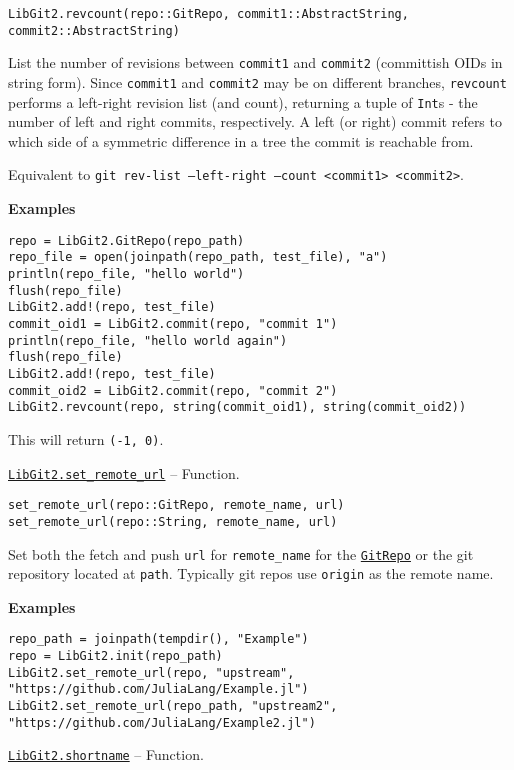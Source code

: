 \begin{adjustwidth}{2em}{0pt}


\begin{verbatim}
LibGit2.revcount(repo::GitRepo, commit1::AbstractString, commit2::AbstractString)
\end{verbatim}

List the number of revisions between \texttt{commit1} and \texttt{commit2} (committish OIDs in string form). Since \texttt{commit1} and \texttt{commit2} may be on different branches, \texttt{revcount} performs a {\textquotedbl}left-right{\textquotedbl} revision list (and count), returning a tuple of \texttt{Int}s - the number of left and right commits, respectively. A left (or right) commit refers to which side of a symmetric difference in a tree the commit is reachable from.

Equivalent to \texttt{git rev-list --left-right --count <commit1> <commit2>}.

\textbf{Examples}


\begin{verbatim}
repo = LibGit2.GitRepo(repo_path)
repo_file = open(joinpath(repo_path, test_file), "a")
println(repo_file, "hello world")
flush(repo_file)
LibGit2.add!(repo, test_file)
commit_oid1 = LibGit2.commit(repo, "commit 1")
println(repo_file, "hello world again")
flush(repo_file)
LibGit2.add!(repo, test_file)
commit_oid2 = LibGit2.commit(repo, "commit 2")
LibGit2.revcount(repo, string(commit_oid1), string(commit_oid2))
\end{verbatim}

This will return \texttt{(-1, 0)}.



\end{adjustwidth}
\hypertarget{17796350858376315108}{} 
\hyperlink{17796350858376315108}{\texttt{LibGit2.set\_remote\_url}}  -- {Function.}

\begin{adjustwidth}{2em}{0pt}


\begin{verbatim}
set_remote_url(repo::GitRepo, remote_name, url)
set_remote_url(repo::String, remote_name, url)
\end{verbatim}

Set both the fetch and push \texttt{url} for \texttt{remote\_name} for the \hyperlink{3263346103236484748}{\texttt{GitRepo}} or the git repository located at \texttt{path}. Typically git repos use \texttt{{\textquotedbl}origin{\textquotedbl}} as the remote name.

\textbf{Examples}


\begin{verbatim}
repo_path = joinpath(tempdir(), "Example")
repo = LibGit2.init(repo_path)
LibGit2.set_remote_url(repo, "upstream", "https://github.com/JuliaLang/Example.jl")
LibGit2.set_remote_url(repo_path, "upstream2", "https://github.com/JuliaLang/Example2.jl")
\end{verbatim}



\end{adjustwidth}
\hypertarget{16470264269906288721}{} 
\hyperlink{16470264269906288721}{\texttt{LibGit2.shortname}}  -- {Function.}

